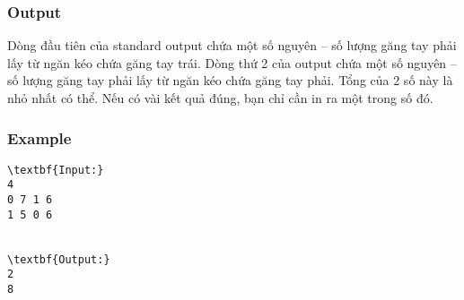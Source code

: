 \subsubsection{   Output  }

   Dòng đầu tiên của standard output chứa một số nguyên – số lượng găng tay phải lấy từ ngăn kéo chứa găng tay trái. Dòng thứ 2 của output chứa một số nguyên – số lượng găng tay phải lấy từ ngăn kéo chứa găng tay phải. Tổng của 2 số này là nhỏ nhất có thể. Nếu có vài kết quả đúng, bạn chỉ cần in ra một trong số đó.  

\subsubsection{   Example  }
\begin{verbatim}
\textbf{Input:}
4
0 7 1 6
1 5 0 6


\textbf{Output:}
2
8

\end{verbatim}
